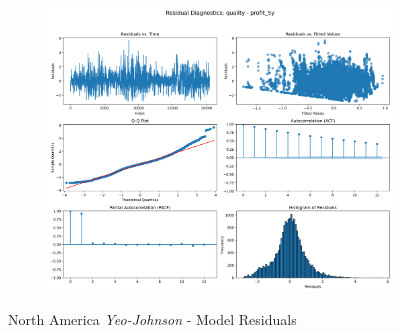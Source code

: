 \documentclass[11pt,english,a4paper,hidelinks]{book}
\begin{document}
\begin{figure}[H]
\begin{subfigure}[b]{0.32\textwidth}
    \end{subfigure}
    \hfill
    \begin{subfigure}[b]{0.32\textwidth}
        \centering
        \includegraphics[width=\textwidth]{images/code/models/linear_regression/first_model/USA/quality_profit_5y_residuals - Gaussian.png}
    \end{subfigure}
    \caption{North America \textit{Yeo-Johnson} - Model Residuals}
    \label{fig:linear_regression_USA_residues_gaussian}
\end{figure}
\end{document}

